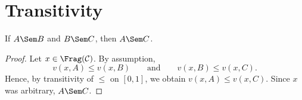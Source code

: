 \section{Transitivity}
\begin{theorem}[Transitivity]
If $A \Sem B$ and $B \Sem C$, then $A \Sem C$.
\end{theorem}

\begin{proof}
Let $x \in \Frag(\mathcal C)$. By assumption,
\[
v(x,A) \leq v(x,B)
\qquad\text{and}\qquad
v(x,B) \leq v(x,C).
\]
Hence, by transitivity of $\leq$ on $[0,1]$, we obtain $v(x,A) \leq v(x,C)$. Since $x$ was
arbitrary, $A \Sem C$.
\end{proof}

